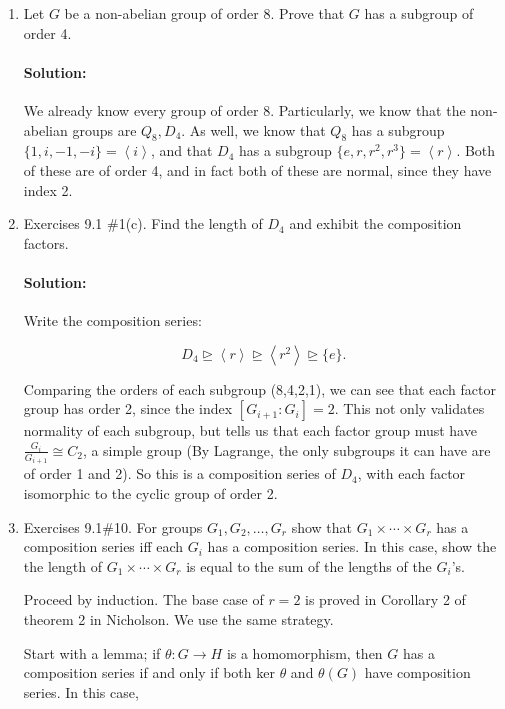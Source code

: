 \documentclass{article}
\begin{document}
\begin{enumerate} 

    \item Let $G$ be a non-abelian group of order 8. Prove that $G$ has a subgroup of order 4.

        \paragraph{Solution: }We already know every group of order 8. Particularly, we know that the non-abelian groups are $Q_8, D_4$. As well, we know that $Q_8$ has a subgroup
        $\{1,i,-1,-i\} =\left<i \right>$, and that $D_4$ has a subgroup $\{e,r,r^2,r^3\} =\left<r \right>$. Both of these are of order 4, and in fact both of these are normal,
        since they have index 2.

    \item Exercises 9.1 \#1(c). Find the length of $D_{4}$ and exhibit the composition factors.

        \paragraph{Solution: }Write the composition series:

        \[ D_4\trianglerighteq \left< r \right>\trianglerighteq \left<r^2 \right>\trianglerighteq \{e\} .\] 

        Comparing the orders of each subgroup (8,4,2,1), we can see that each factor group has order 2, since the index $[G_{i+1}:G_{i}]=2$. This not only validates normality
        of each subgroup, but tells us that each factor group must have $\frac{G_i}{G_{i+1}}\cong C_2$, a simple group (By Lagrange, the only subgroups it can have are of order 1 and 2).
        So this is a composition series of $D_4$, with each
        factor isomorphic to the cyclic group of order 2.

    \item Exercises 9.1\#10. For groups $G_1,G_2,\ldots,G_r$ show that $G_{1}\times\cdots\times G_{r}$ has a composition series iff each $G_{i}$ has a composition series. In this case, show the the length of $G_{1}\times\cdots\times G_{r}$ is equal to the sum of the lengths of the $G_{i}$'s.

        Proceed by induction. The base case of $r=2$ is proved in Corollary 2 of theorem 2 in Nicholson. We use the same strategy.

        Start with a lemma; if $\theta : G\to H$ is a homomorphism, then $G$ has a composition series if
        and only if both ker $\theta$ and $\theta ( G)$ have composition series.  In this case, 


\end{enumerate}
\end{document}
